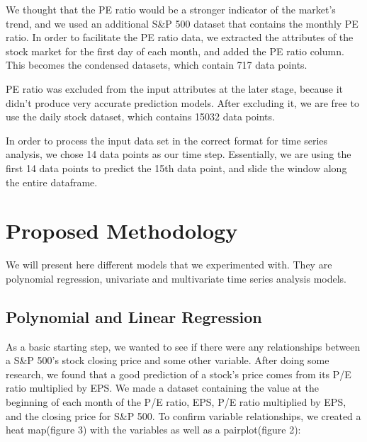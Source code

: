 \documentclass{article}
\begin{document}
We thought that the PE ratio would be a stronger indicator of the market’s trend, and we used an additional S\&P 500 dataset that contains the monthly PE ratio. In order to facilitate the PE ratio data, we extracted the attributes of the stock market for the first day of each month, and added the PE ratio column. This becomes the condensed datasets, which contain 717 data points.

PE ratio was excluded from the input attributes at the later stage, because it didn’t produce very accurate prediction models. After excluding it, we are free to use the daily stock dataset, which contains 15032 data points.

In order to process the input data set in the correct format for time series analysis, we chose 14 data points as our time step. Essentially, we are using the first 14 data points to predict the 15th data point, and slide the window along the entire dataframe. 
 


\section{Proposed Methodology} 

We will present here different models that we experimented with. They are polynomial regression, univariate and multivariate time series analysis models. 

\subsection{Polynomial and Linear Regression}

As a basic starting step, we wanted to see if there were any relationships between a S\&P 500’s stock closing price and some other variable. After doing some research, we found that a good prediction of a stock's price comes from its P/E ratio multiplied by EPS. We made a dataset containing the value at the beginning of each month of the P/E ratio, EPS, P/E ratio multiplied by EPS, and the closing price for S\&P 500. To confirm variable relationships, we created a heat map(figure 3) with the variables as well as a pairplot(figure 2):
\end{document}
